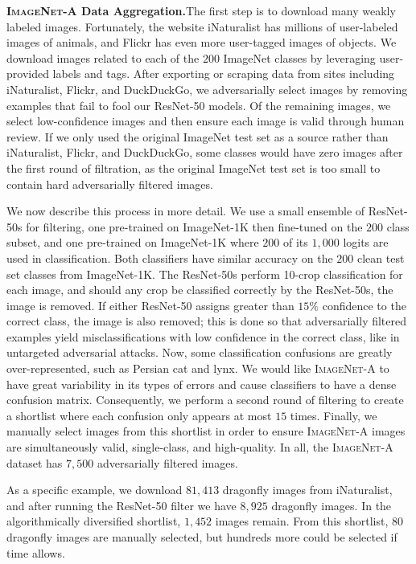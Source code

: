 \documentclass[10pt,twocolumn,letterpaper]{article}
\begin{document}
\noindent\textbf{\textsc{ImageNet-A} Data Aggregation.}\quad The first step is to download many weakly labeled images. Fortunately, the website iNaturalist has millions of user-labeled images of animals, and Flickr has even more user-tagged images of objects. We download images related to each of the $200$ ImageNet classes by leveraging user-provided labels and tags. After exporting or scraping data from sites including iNaturalist, Flickr, and DuckDuckGo, we adversarially select images by removing examples that fail to fool our ResNet-50 models. Of the remaining images, we select low-confidence images and then ensure each image is valid through human review. If we only used the original ImageNet test set as a source rather than iNaturalist, Flickr, and DuckDuckGo, some classes would have zero images after the first round of filtration, as the original ImageNet test set is too small to contain hard adversarially filtered images.

We now describe this process in more detail. We use a small ensemble of ResNet-50s for filtering, one pre-trained on ImageNet-1K then fine-tuned on the $200$ class subset, and one pre-trained on ImageNet-1K where $200$ of its $1,000$ logits are used in classification. Both classifiers have similar accuracy on the $200$ clean test set classes from ImageNet-1K. The ResNet-50s perform 10-crop classification for each image, and should any crop be classified correctly by the ResNet-50s, the image is removed. If either ResNet-50 assigns greater than $15\%$ confidence to the correct class, the image is also removed; this is done so that adversarially filtered examples yield misclassifications with low confidence in the correct class, like in untargeted adversarial attacks. Now, some classification confusions are greatly over-represented, such as Persian cat and lynx. We would like \textsc{ImageNet-A} to have great variability in its types of errors and cause classifiers to have a dense confusion matrix. Consequently, we perform a second round of filtering to create a shortlist where each confusion only appears at most $15$ times. Finally, we manually select images from this shortlist in order to ensure \textsc{ImageNet-A} images are simultaneously valid, single-class, and high-quality. In all, the \textsc{ImageNet-A} dataset has $7,500$ adversarially filtered images.

As a specific example, we download $81,413$ dragonfly images from iNaturalist, and after running the ResNet-50 filter we have $8,925$ dragonfly images. In the algorithmically diversified shortlist, $1,452$ images remain. From this shortlist, $80$ dragonfly images are manually selected, but hundreds more could be selected if time allows.
\end{document}
